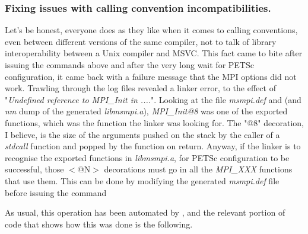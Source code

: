 \documentclass[10pt,a4paper]{article}
\begin{document}
\begin{center}
\end{center}

\subsubsection{Fixing issues with calling convention incompatibilities.}
Let's be honest, everyone does as they like when it comes to calling
conventions, even between different versions of the same compiler, not to talk
of library interoperability between a Unix compiler and MSVC. This fact came to
bite after issuing the commands above and after the very long wait for PETSc
configuration, it came back with a failure message that the MPI options did not
work. Trawling through the log files revealed a linker error, to the effect of
"\textit{Undefined reference to MPI\_Init in ....}". Looking at the file
\textit{msmpi.def} and (and \textit{nm} dump of the generated
\textit{libmsmpi.a}), \textit{MPI\_Init@8} was one of the exported functions,
which was the function the linker was looking for. The "@8" decoration, I
believe, is the size of the arguments pushed on the stack by the caller of a
\textit{stdcall} function and popped by the function on return. Anyway, if the
linker is to recognise the exported functions in \textit{libmsmpi.a}, for PETSc
configuration to be successful, those $<$@N$>$ decorations must go in all the
\textit{MPI\_XXX} functions that use them. This can be done by modifying the
generated \textit{msmpi.def} file before issuing the command

\begin{center}
\end{center}

As usual, this operation has been automated by \chastelibbuilder, and the
relevant portion of code that shows how this was done is the following.
\end{document}
